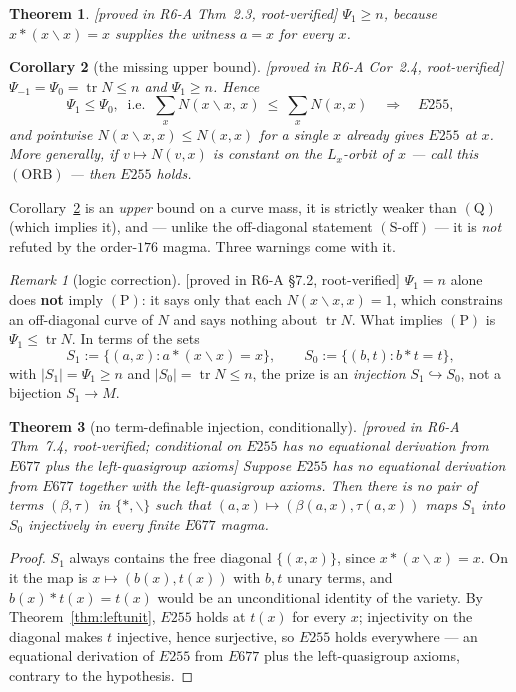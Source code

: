 \documentclass[11pt]{article}
\theoremstyle{plain}
\newtheorem{theorem}{Theorem}[section]
\newtheorem{corollary}[theorem]{Corollary}
\theoremstyle{definition}
\theoremstyle{remark}
\newtheorem*{remark*}{Remark}
\numberwithin{equation}{section}
\newcommand{\op}{\mathbin{*}}
\newcommand{\tr}{\operatorname{tr}}
\newcommand{\statusbox}[1]{{\small\sloppy\textsf{[#1]}}}
\newcommand{\PROVED}[1]{\statusbox{proved in #1, root-verified}}
\newcommand{\PROVEDC}[2]{\statusbox{proved in #1, root-verified; \emph{conditional on} #2}}
\begin{document}
\begin{theorem}\label{thm:psione}
\PROVED{R6-A Thm~2.3}
$\Psi_1 \ge n$, because $x\op(x\backslash x) = x$ supplies the witness $a = x$ for
every $x$.
\end{theorem}

\begin{corollary}[the missing upper bound]\label{cor:psicrit}
\PROVED{R6-A Cor~2.4}
$\Psi_{-1} = \Psi_0 = \tr N\le n$ and $\Psi_1\ge n$. Hence
\[
  \Psi_1 \le \Psi_0,\ \text{ i.e. }\
  \sum_x N(x\backslash x,\,x)\ \le\ \sum_x N(x,x)
  \quad\Longrightarrow\quad E255 ,
\]
and pointwise $N(x\backslash x,x)\le N(x,x)$ for a single $x$ already gives $E255$
at $x$. More generally, if $v\mapsto N(v,x)$ is constant on the $L_x$-orbit of $x$
--- call this $(\mathrm{ORB})$ --- then $E255$ holds.
\end{corollary}

Corollary~\ref{cor:psicrit} is an \emph{upper} bound on a curve mass, it is
strictly weaker than $(\mathrm{Q})$ (which implies it), and --- unlike the
off-diagonal statement $(\mathrm{S\text{-}off})$ --- it is \emph{not} refuted by
the order-$176$ magma. Three warnings come with it.

\begin{remark*}[logic correction]
\PROVED{R6-A \S7.2}
$\Psi_1 = n$ alone does \textbf{not} imply $(\mathrm{P})$: it says only that each
$N(x\backslash x,x) = 1$, which constrains an off-diagonal curve of $N$ and says
nothing about $\tr N$. What implies $(\mathrm{P})$ is $\Psi_1\le\tr N$. In terms
of the sets
\[
  S_1 := \{(a,x) : a\op(x\backslash x) = x\},\qquad
  S_0 := \{(b,t) : b\op t = t\},
\]
with $|S_1| = \Psi_1\ge n$ and $|S_0| = \tr N\le n$, the prize is an
\emph{injection} $S_1\hookrightarrow S_0$, not a bijection $S_1\to M$.
\end{remark*}

\begin{theorem}[no term-definable injection, conditionally]\label{thm:notermpsi}
\PROVEDC{R6-A Thm~7.4}{$E255$ has no equational derivation from $E677$ plus the
left-quasigroup axioms}
Suppose $E255$ has no equational derivation from $E677$ together with the
left-quasigroup axioms. Then there is no pair of terms $(\beta,\tau)$ in
$\{\op,\backslash\}$ such that $(a,x)\mapsto(\beta(a,x),\tau(a,x))$ maps $S_1$
into $S_0$ injectively in every finite $E677$ magma.
\end{theorem}

\begin{proof}
$S_1$ always contains the free diagonal $\{(x,x)\}$, since $x\op(x\backslash x) = x$.
On it the map is $x\mapsto(b(x),t(x))$ with $b,t$ unary terms, and
$b(x)\op t(x) = t(x)$ would be an unconditional identity of the variety. By
Theorem~\ref{thm:leftunit}, $E255$ holds at $t(x)$ for every $x$; injectivity on
the diagonal makes $t$ injective, hence surjective, so $E255$ holds everywhere ---
an equational derivation of $E255$ from $E677$ plus the left-quasigroup axioms,
contrary to the hypothesis.
\end{proof}
\end{document}
